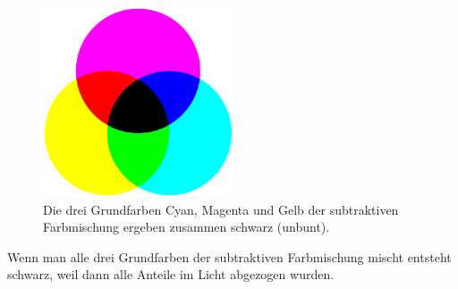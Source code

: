\begin{figure}[H]     %
\centering
\includegraphics[width=0.5\textwidth]{bilder/farben-} 
\caption {Die drei Grundfarben Cyan, Magenta und Gelb der subtraktiven Farbmischung ergeben zusammen schwarz (unbunt).\protect\footnotemark}\label{b_farben-}
\end{figure}


\noindent Wenn man alle drei Grundfarben der subtraktiven Farbmischung mischt entsteht schwarz, weil dann alle Anteile im Licht abgezogen wurden.


